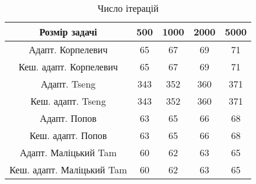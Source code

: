 \begin{table}[H]
	\centering
	\begin{tabular}{|c||c|c|c|c|}\hline
		Розмір задачі & 500 & 1000 & 2000 & 5000 \\ \hline \hline
		Адапт. Корпелевич & 65 & 67 & 69 & 71 \\ \hline
		Кеш. адапт. Корпелевич & 65 & 67 & 69 & 71 \\ \hline
		Адапт. Tseng & 343 & 352 & 360 & 371 \\ \hline
		Кеш. адапт. Tseng & 343 & 352 & 360 & 371 \\ \hline
		Адапт. Попов & 63 & 65 & 66 & 68 \\ \hline
		Кеш. адапт. Попов & 63 & 65 & 66 & 68 \\ \hline
		Адапт. Маліцький Tam & 60 & 62 & 63 & 65 \\ \hline
		Кеш. адапт. Маліцький Tam & 60 & 62 & 63 & 65 \\ \hline
	\end{tabular}
	\caption{Число ітерацій}
\end{table}
